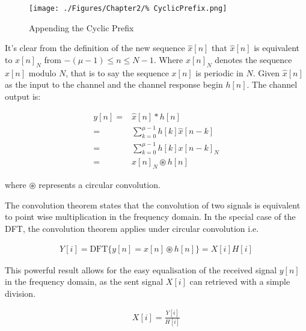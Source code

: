 \begin{figure}[h!]
	\texttt{[image: ./Figures/Chapter2/\%
	CyclicPrefix.png]}
	\caption{Appending the Cyclic Prefix}
	\label{fig:CyclicPrefix}
\end{figure}

It's clear from the definition of the new sequence $\hat{x}[n]$ that %
$\hat{x}[n]$ is equivalent to $x[n]_{N}$ from $-(\mu-1) \leq n \leq %
N-1$. Where $x[n]_{N}$ denotes the sequence $x[n]$ modulo $N$, that %
is to say the sequence $x[n]$ is periodic in $N$. Given $\hat{x}[n]$ %
as the input to the channel and the channel response begin $h[n]$. %
The channel output is:

\begin{align}
	y[n] =& \hat{x}[n]*h[n]\\
	     =& \sum_{k=0}^{\mu-1}h[k]\hat{x}[n-k]\\
	     =& \sum_{k=0}^{\mu-1}h[k]x[n-k]_{N}\\
	     =& x[n]_{N}\circledast h[n]
\end{align}

where $\circledast$ represents a circular convolution. %

The convolution theorem states that the convolution %
of two  signals is equivalent to point wise %
multiplication in the frequency domain\cite{MathWorldConvolution%
Theorem}. In the special case of the DFT, the convolution theorem %
applies under circular convolution i.e.

\begin{align}
	Y[i] = \text{DFT}\{y[n] = x[n]\circledast h[n]\} = X[i]H[i]	
	\label{eq:DFTConvolutionTheorem}
\end{align}

This powerful result allows for the easy equalisation of the received %
signal $y[n]$ in the frequency domain, as the sent signal $X[i]$ can %
retrieved with a simple division.

\begin{align}
	X[i] = \frac{Y[i]}{H[i]}
	\label{eq:ZeroForcing}
\end{align}
